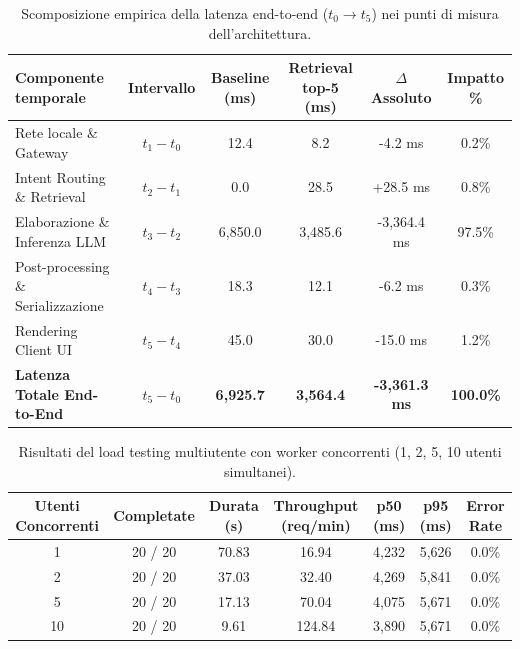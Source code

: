 \begin{table}[htbp]
\centering
\small
\caption{Scomposizione empirica della latenza end-to-end ($t_0 \to t_5$) nei punti di misura dell'architettura.}
\label{tab:latency_decomposition}
\begin{tabular}{lccccc}
\hline
\textbf{Componente temporale} & \textbf{Intervallo} & \textbf{Baseline (ms)} & \textbf{Retrieval top-5 (ms)} & \textbf{$\Delta$ Assoluto} & \textbf{Impatto \%} \\
\hline
Rete locale \& Gateway & $t_1 - t_0$ & 12.4 & 8.2 & -4.2 ms & 0.2\% \\
Intent Routing \& Retrieval & $t_2 - t_1$ & 0.0 & 28.5 & +28.5 ms & 0.8\% \\
Elaborazione \& Inferenza LLM & $t_3 - t_2$ & 6,850.0 & 3,485.6 & -3,364.4 ms & 97.5\% \\
Post-processing \& Serializzazione & $t_4 - t_3$ & 18.3 & 12.1 & -6.2 ms & 0.3\% \\
Rendering Client UI & $t_5 - t_4$ & 45.0 & 30.0 & -15.0 ms & 1.2\% \\
\hline
\textbf{Latenza Totale End-to-End} & $t_5 - t_0$ & \textbf{6,925.7} & \textbf{3,564.4} & \textbf{-3,361.3 ms} & \textbf{100.0\%} \\
\hline
\end{tabular}
\end{table}

\begin{table}[htbp]
\centering
\small
\caption{Risultati del load testing multiutente con worker concorrenti (1, 2, 5, 10 utenti simultanei).}
\label{tab:concurrency_load_testing}
\begin{tabular}{ccccccc}
\hline
\textbf{Utenti Concorrenti} & \textbf{Completate} & \textbf{Durata (s)} & \textbf{Throughput (req/min)} & \textbf{p50 (ms)} & \textbf{p95 (ms)} & \textbf{Error Rate} \\
\hline
1 & 20 / 20 & 70.83 & 16.94 & 4,232 & 5,626 & 0.0\% \\
2 & 20 / 20 & 37.03 & 32.40 & 4,269 & 5,841 & 0.0\% \\
5 & 20 / 20 & 17.13 & 70.04 & 4,075 & 5,671 & 0.0\% \\
10 & 20 / 20 & 9.61 & 124.84 & 3,890 & 5,671 & 0.0\% \\
\hline
\end{tabular}
\end{table}
